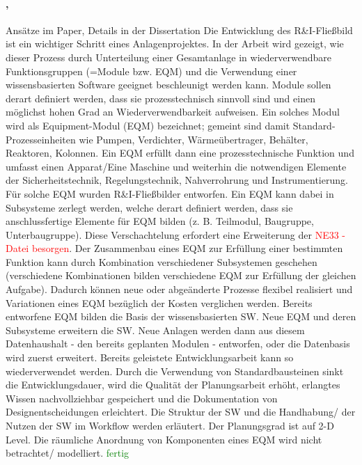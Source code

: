  \paragraph*{\cite{Uzuner_2012}, \cite{Uzuner_2013}} Ans\"atze im Paper, Details in der Dissertation \hfill \newline
Die Entwicklung des R{\&}I-Flie{\ss}bild ist ein wichtiger Schritt eines Anlagenprojektes. In der Arbeit wird gezeigt, wie dieser Prozess durch Unterteilung einer Gesamtanlage in wiederverwendbare Funktionsgruppen (=Module bzw. EQM) und die Verwendung einer wissensbasierten Software geeignet beschleunigt werden kann. Module sollen derart definiert werden, dass sie prozesstechnisch sinnvoll sind und einen m\"oglichst hohen Grad an Wiederverwendbarkeit aufweisen. Ein solches Modul wird als Equipment-Modul (EQM) bezeichnet; gemeint sind damit Standard-Prozesseinheiten wie Pumpen, Verdichter, W\"arme\"ubertrager, Beh\"alter, Reaktoren, Kolonnen. Ein EQM erf\"ullt dann eine prozesstechnische Funktion und umfasst einen Apparat/Eine Maschine und weiterhin die notwendigen Elemente der Sicherheitstechnik, Regelungstechnik, Nahverrohrung und Instrumentierung. F\"ur solche EQM wurden R{\&}I-Flie{\ss}bilder entworfen. Ein EQM kann dabei in Subsysteme zerlegt werden, welche derart definiert werden, dass sie anschlussfertige Elemente f\"ur EQM bilden (z. B. Teilmodul, Baugruppe, Unterbaugruppe). Diese Verschachtelung erfordert eine Erweiterung der \textcolor{red}{NE33 - Datei besorgen}. Der Zusammenbau eines EQM zur Erf\"ullung einer bestimmten Funktion kann durch Kombination verschiedener Subsystemen geschehen (verschiedene Kombinationen bilden verschiedene EQM zur Erf\"ullung der gleichen Aufgabe). Dadurch k\"onnen neue oder abge\"anderte Prozesse flexibel realisiert und Variationen eines EQM bez\"uglich der Kosten verglichen werden. Bereits entworfene EQM bilden die Basis der wissensbasierten SW. Neue EQM und deren Subsysteme erweitern die SW. Neue Anlagen werden dann aus diesem Datenhaushalt - den bereits geplanten Modulen - entworfen, oder die Datenbasis wird zuerst erweitert. Bereits geleistete Entwicklungsarbeit kann so wiederverwendet werden. Durch die Verwendung von Standardbausteinen sinkt die Entwicklungsdauer, wird die Qualit\"at der Planungsarbeit erh\"oht, erlangtes Wissen nachvollziehbar gespeichert und die Dokumentation von Designentscheidungen erleichtert. Die Struktur der SW und die Handhabung/ der Nutzen der SW im Workflow werden erl\"autert. Der Planungsgrad ist auf 2-D Level. Die r\"aumliche Anordnung von Komponenten eines EQM wird nicht betrachtet/ modelliert. \textcolor{green}{fertig}

